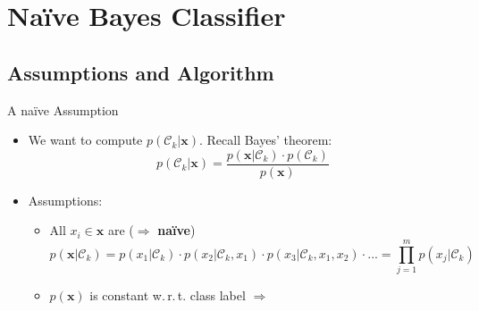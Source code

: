 \section{Na\"{i}ve Bayes Classifier}

\subsection{Assumptions and Algorithm}

\begin{frame}{A na\"{i}ve Assumption}{}
	\begin{itemize}
		\item We want to compute $p(\mathcal{C}_k \vert \bm{x})$. Recall Bayes' theorem:
		\begin{equation}
			p(\mathcal{C}_k \vert \bm{x}) = \frac{p(\bm{x} \vert \mathcal{C}_k) \cdot p(\mathcal{C}_k)}{p(\bm{x})}
		\end{equation}
		\item Assumptions:
		\begin{itemize}
			\item All $x_i \in \bm{x}$ are 
				($\Rightarrow$ \textbf{na\"{i}ve})
			\begin{equation}
				p(\bm{x} \vert \mathcal{C}_k) 
					= p(x_1 \vert \mathcal{C}_k) \cdot p(x_2 \vert \mathcal{C}_k, x_1) \cdot
						p(x_3 \vert \mathcal{C}_k, x_1, x_2) \cdot ... 
					= \prod_{j=1}^m p(x_j \vert \mathcal{C}_k)
			\end{equation}
			\item $p(\bm{x})$ is constant w.\,r.\,t. class label
				$\Rightarrow$ 
		\end{itemize}
	\end{itemize}
\end{frame}


